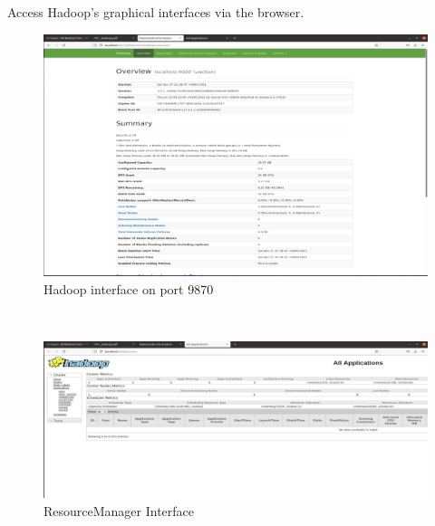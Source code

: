 \begin{spacing}{1.2}
\par Access Hadoop's graphical interfaces via the browser.
\\
\begin{figure}[!htb] 
\begin{center} 
\includegraphics[width=1\linewidth]{Big_Data/Hadoop/Apache Hadoop Installation/Hadoop interface on port 9870} 
\end{center} 
\caption{Hadoop interface on port 9870} 
\end{figure} 
\FloatBarrier
\\
\begin{figure}[!htb] 
\begin{center} 
\includegraphics[width=1\linewidth]{Big_Data/Hadoop/Apache Hadoop Installation/ResourceManager Interface} 
\end{center} 
\caption{ResourceManager Interface} 
\end{figure} 
\FloatBarrier




\end{spacing}